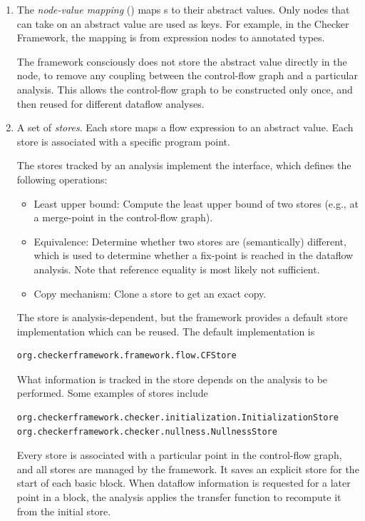 \begin{enumerate}
\item
The \emph{node-value mapping} () maps s to their abstract
values.  Only nodes that can take on an abstract value are
used as keys.  For example, in the Checker Framework, the mapping is
from expression nodes to annotated types.

The framework consciously does not store the abstract value
directly in the node, to remove any coupling between the control-flow
graph and a particular analysis.  This allows the control-flow graph
to be constructed only once, and then reused for different dataflow
analyses.

\item
A set of \emph{stores}.  Each store maps a flow expression to an
abstract value.  Each store is associated with a specific program point.

The stores tracked by an analysis implement the 
interface, which defines the following operations:
\begin{itemize}
\item Least upper bound: Compute the least upper bound of two stores
  (e.g., at a merge-point in the control-flow graph).
\item Equivalence: Determine whether two stores are (semantically)
  different, which is used to determine whether a fix-point is reached in
  the dataflow analysis. Note that reference equality is most likely
  not sufficient.
\item Copy mechanism: Clone a store to get an exact copy.
\end{itemize}
The store is analysis-dependent, but the framework provides a default
store implementation which can be reused.  The default implementation
is
\begin{verbatim}org.checkerframework.framework.flow.CFStore\end{verbatim}

What information is tracked in the store depends on the analysis to be
 performed.  Some examples of stores include
\begin{verbatim}
org.checkerframework.checker.initialization.InitializationStore
org.checkerframework.checker.nullness.NullnessStore
\end{verbatim}

Every store is associated with a particular point in the control-flow
graph, and all stores are managed by the framework. It saves an explicit store
for the start of each basic block.
When dataflow information
is requested for a later point in a block, the analysis applies the
transfer function to recompute it from the initial store.

\end{enumerate}

